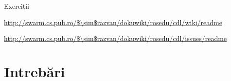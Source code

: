 \documentclass{beamer}
\begin{document}
\begin{frame}{Exerciții}
  \begin{itemize}
    {\footnotesize
    \item \url{http://swarm.cs.pub.ro/$\sim$razvan/dokuwiki/rosedu/cdl/wiki/readme}
    \item \url{http://swarm.cs.pub.ro/$\sim$razvan/dokuwiki/rosedu/cdl/issues/readme}
    }
  \end{itemize}
\end{frame}

\section{Intrebări}
\end{document}
